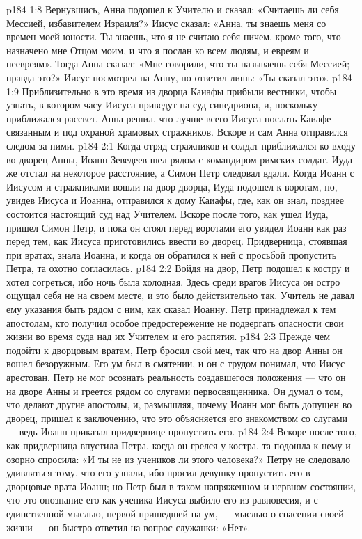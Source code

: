 \vs p184 1:8 Вернувшись, Анна подошел к Учителю и сказал: «Считаешь ли себя Мессией, избавителем Израиля?» Иисус сказал: «Анна, ты знаешь меня со времен моей юности. Ты знаешь, что я не считаю себя ничем, кроме того, что назначено мне Отцом моим, и что я послан ко всем людям, и евреям и неевреям». Тогда Анна сказал: «Мне говорили, что ты называешь себя Мессией; правда это?» Иисус посмотрел на Анну, но ответил лишь: «Ты сказал это».
\vs p184 1:9 Приблизительно в это время из дворца Каиафы прибыли вестники, чтобы узнать, в котором часу Иисуса приведут на суд синедриона, и, поскольку приближался рассвет, Анна решил, что лучше всего Иисуса послать Каиафе связанным и под охраной храмовых стражников. Вскоре и сам Анна отправился следом за ними.
\vs p184 2:1 Когда отряд стражников и солдат приближался ко входу во дворец Анны, Иоанн Зеведеев шел рядом с командиром римских солдат. Иуда же отстал на некоторое расстояние, а Симон Петр следовал вдали. Когда Иоанн с Иисусом и стражниками вошли на двор дворца, Иуда подошел к воротам, но, увидев Иисуса и Иоанна, отправился к дому Каиафы, где, как он знал, позднее состоится настоящий суд над Учителем. Вскоре после того, как ушел Иуда, пришел Симон Петр, и пока он стоял перед воротами его увидел Иоанн как раз перед тем, как Иисуса приготовились ввести во дворец. Придверница, стоявшая при вратах, знала Иоанна, и когда он обратился к ней с просьбой пропустить Петра, та охотно согласилась.
\vs p184 2:2 Войдя на двор, Петр подошел к костру и хотел согреться, ибо ночь была холодная. Здесь среди врагов Иисуса он остро ощущал себя не на своем месте, и это было действительно так. Учитель не давал ему указания быть рядом с ним, как сказал Иоанну. Петр принадлежал к тем апостолам, кто получил особое предостережение не подвергать опасности свои жизни во время суда над их Учителем и его распятия.
\vs p184 2:3 Прежде чем подойти к дворцовым вратам, Петр бросил свой меч, так что на двор Анны он вошел безоружным. Его ум был в смятении, и он с трудом понимал, что Иисус арестован. Петр не мог осознать реальность создавшегося положения --- что он на дворе Анны и греется рядом со слугами первосвященника. Он думал о том, что делают другие апостолы, и, размышляя, почему Иоанн мог быть допущен во дворец, пришел к заключению, что это объясняется его знакомством со слугами --- ведь Иоанн приказал придвернице пропустить его.
\vs p184 2:4 Вскоре после того, как придверница впустила Петра, когда он грелся у костра, та подошла к нему и озорно спросила: «И ты не из учеников ли этого человека?» Петру не следовало удивляться тому, что его узнали, ибо просил девушку пропустить его в дворцовые врата Иоанн; но Петр был в таком напряженном и нервном состоянии, что это опознание его как ученика Иисуса выбило его из равновесия, и с единственной мыслью, первой пришедшей на ум, --- мыслью о спасении своей жизни --- он быстро ответил на вопрос служанки: «Нет».

